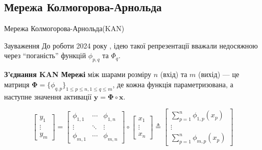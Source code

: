\documentclass{zkdl-presentation-template}
\begin{document}
    \subsection{Мережа Колмогорова-Арнольда}
    \begin{frame}{Мережа Колмогорова-Арнольда(KAN)}
        \begin{block}{Зауваження}
            До роботи 2024 року \cite{kan}, ідею такої репрезентації вважали недосяжною через
            ``поганість'' функцій $\phi_{p,q}$ та $\Phi_q$. \pause
        \end{block}

        \begin{definition}
            \textbf{З'єднання KAN Мережі} між шарами розміру $n$ (вхід)
            та $m$ (вихід) --- це матриця $\boldsymbol{\Phi} = \{\phi_{q,p}\}_{1 \leq p \leq n, 1 \leq q \leq m}$, де 
            кожна функція параметризована, а наступне значення активації $\boldsymbol{y} = \boldsymbol{\Phi} \circ \boldsymbol{x}$.\pause
        \end{definition}

        \begin{equation*}
            \begin{bmatrix}
                y_1 \\
                \vdots \\
                y_{m}
            \end{bmatrix} =
            \begin{bmatrix}
                \phi_{1,1} & \cdots & \phi_{1,n} \\
                \vdots & \ddots & \vdots \\
                \phi_{m,1} & \cdots & \phi_{m,n}
            \end{bmatrix}\circ \begin{bmatrix}
                x_1 \\
                \vdots \\
                x_n
            \end{bmatrix} \triangleq \begin{bmatrix}
                \sum_{p=1}^n \phi_{1,p}(x_p) \\
                \vdots \\
                \sum_{p=1}^n \phi_{m,p}(x_p)
            \end{bmatrix}
        \end{equation*}
    \end{frame}
\end{document}
